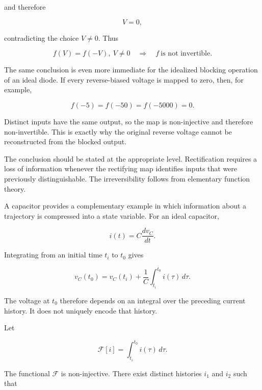\documentclass[11pt]{article}
\begin{document}
and therefore

\begin{equation}
V=0,
\end{equation}

contradicting the choice $V\neq0$. Thus

\begin{equation}
\boxed{
f(V)=f(-V),\ V\neq0
\quad\Longrightarrow\quad
f\ \text{is not invertible}.
}
\end{equation}

The same conclusion is even more immediate for the idealized blocking operation of an ideal diode. If every reverse-biased voltage is mapped to zero, then, for example,

\begin{equation}
f(-5)=f(-50)=f(-5000)=0.
\end{equation}

Distinct inputs have the same output, so the map is non-injective and therefore non-invertible. This is exactly why the original reverse voltage cannot be reconstructed from the blocked output.

The conclusion should be stated at the appropriate level. Rectification requires a loss of information whenever the rectifying map identifies inputs that were previously distinguishable. The irreversibility follows from elementary function theory.

A capacitor provides a complementary example in which information about a trajectory is compressed into a state variable. For an ideal capacitor,

\begin{equation}
i(t)=C\frac{dv_C}{dt}.
\end{equation}

Integrating from an initial time $t_i$ to $t_0$ gives

\begin{equation}
v_C(t_0)
=
v_C(t_i)
+
\frac{1}{C}
\int_{t_i}^{t_0}i(\tau)\,d\tau.
\end{equation}

The voltage at $t_0$ therefore depends on an integral over the preceding current history. It does not uniquely encode that history.

Let

\begin{equation}
\mathcal F[i]
=
\int_{t_i}^{t_0}i(\tau)\,d\tau.
\end{equation}

The functional $\mathcal F$ is non-injective. There exist distinct histories $i_1$ and $i_2$ such that
\end{document}
